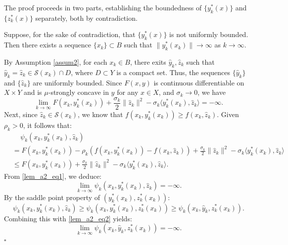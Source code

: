 \documentclass{article}
\newenvironment{proof}[1][Proof]{\par
	\normalfont\topsep6pt\relax
	\trivlist\item[\hskip\labelsep\itshape #1.]\ignorespaces
}{%
	\hfill\ensuremath{\square}\endtrivlist
}
\begin{document}
\begin{proof}
The proof proceeds in two parts, establishing the boundedness of $\{y^*_{k}(x)\}$ and $\{z^*_{k}(x)\}$ separately, both by contradiction.

Suppose, for the sake of contradiction, that $\{y^*_{k}(x)\}$ is not uniformly bounded. Then there exists a sequence $\{x_k\} \subset B$
such that $\|y^*_{k}(x_k)\| \rightarrow \infty$ as $k \rightarrow \infty$.

By Assumption \ref{assum2}, for each $x_k \in B$, there exits $\hat{y}_k, \hat{z}_k$ such that $\hat{y}_k = \hat{z}_k \in \mathcal{S}(x_k) \cap D$, where $D \subset Y$ is a compact set. Thus, the sequences $\{\hat{y}_k\}$ and $\{\hat{z}_k\}$ are uniformly bounded. Since $F(x,y)$ is continuous differentiable on $X \times Y$ and is $\mu$-strongly concave in $y$ for any $x \in X$, and $\sigma_k \rightarrow 0$, we have 
\begin{equation}\label{lem_a2_eq1}
    \lim_{k \rightarrow \infty} F(x_{k},y_{k}^*(x_{k}))+ \frac{\sigma_k}{2}\|\hat{z}_k\|^2 - \sigma_k \langle y_{k}^*(x_{k}), \hat{z}_k \rangle = - \infty.
\end{equation}    
Next, since $\hat{z}_k \in \mathcal{S}(x_k)$, we know that $f(x_k,  y_{k}^*(x_{k})) \ge f(x_k, \hat{z}_k)$. Given $\rho_k > 0$, it follows that:
\[
\begin{aligned}
    & \quad \, \psi_k(x_k, y_{k}^*(x_{k}), \hat{z}_k) \\
    &= F(x_k,y_{k}^*(x_{k})) - \rho_k( f(x_k,  y_{k}^*(x_{k})) - f(x_k, \hat{z}_k)) + \frac{\sigma_k}{2}\|\hat{z}_k\|^2 - \sigma_k \langle y_{k}^*(x_{k}), \hat{z}_k \rangle \\
    & \le F(x_k,y_{k}^*(x_{k})) + \frac{\sigma_k}{2}\|\hat{z}_k\|^2 - \sigma_k \langle y_{k}^*(x_{k}), \hat{z}_k \rangle.
\end{aligned}
\]
From \eqref{lem_a2_eq1}, we deduce:
\begin{equation}\label{lem_a2_eq2}
 \lim_{k \rightarrow \infty}  \psi_k(x_k, y_{k}^*(x_{k}), \hat{z}_k) = - \infty.
\end{equation}
By the saddle point property of $(y_k^*(x_k), z_k^*(x_k))$:
    \begin{equation*}
        \psi_k(x_k, y_{k}^*(x_{k}), \hat{z}_k) \ge \psi_k(x_k,y_{k}^*(x_k), z_{k}^*(x_k))\ge \psi_k(x_k, \hat{y}_k, z_{k}^*(x_k)).
    \end{equation*}
Combining this with \eqref{lem_a2_eq2} yields:
\begin{equation}\label{lem_a2_eq3}
     \lim_{k \rightarrow \infty} \psi_k(x_k, \hat{y}_k, z_{k}^*(x_k)) = - \infty.

\end{equation}
\end{proof}
\end{document}
